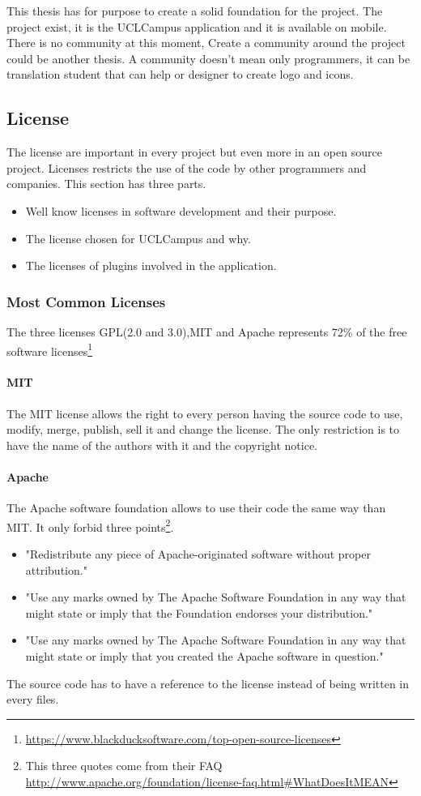 \documentclass{eplmastersthesis}
\begin{document}
This thesis has for purpose to create a solid foundation for the project. The project exist, it is the UCLCampus application and it is available on mobile. There is no community at this moment, Create a community around the project could be another thesis. A community doesn't mean only programmers, it can be translation student that can help or designer to create logo and icons. 

\subsection{License}
The license are important in every project but even more in an open source project. Licenses restricts the use of the code by other programmers and companies. This section has three parts.
\begin{itemize}
\item Well know licenses in software development and their purpose.
\item The license chosen for UCLCampus and why.
\item The licenses of plugins involved in the application.
\end{itemize}
\subsubsection{Most Common Licenses}
The three licenses GPL(2.0 and 3.0),MIT and Apache represents 72\% of the free software licenses\footnote{\url{https://www.blackducksoftware.com/top-open-source-licenses}}
\paragraph{MIT}
The MIT license allows the right to every person having the source code to use, modify, merge, publish, sell it and change the license. The only restriction is to have the name of the authors with it and the copyright notice.
\paragraph{Apache}
The Apache software foundation allows to use their code the same way than MIT. It only forbid three points\footnote{This three quotes come from their FAQ \url{http://www.apache.org/foundation/license-faq.html\#WhatDoesItMEAN}}.
\begin{itemize}
\item "Redistribute any piece of Apache-originated software without proper attribution."
\item "Use any marks owned by The Apache Software Foundation in any way that might state or imply that the Foundation endorses your distribution."
\item "Use any marks owned by The Apache Software Foundation in any way that might state or imply that you created the Apache software in question."
\end{itemize}
The source code has to have a reference to the license instead of being written in every files. 
\end{document}
